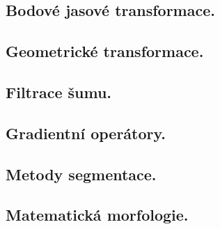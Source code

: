 \subsection{Bodové jasové transformace.}

\subsection{Geometrické transformace.}

\subsection{Filtrace šumu.}

\subsection{Gradientní operátory.}

\subsection{Metody segmentace.}

\subsection{Matematická morfologie.}
